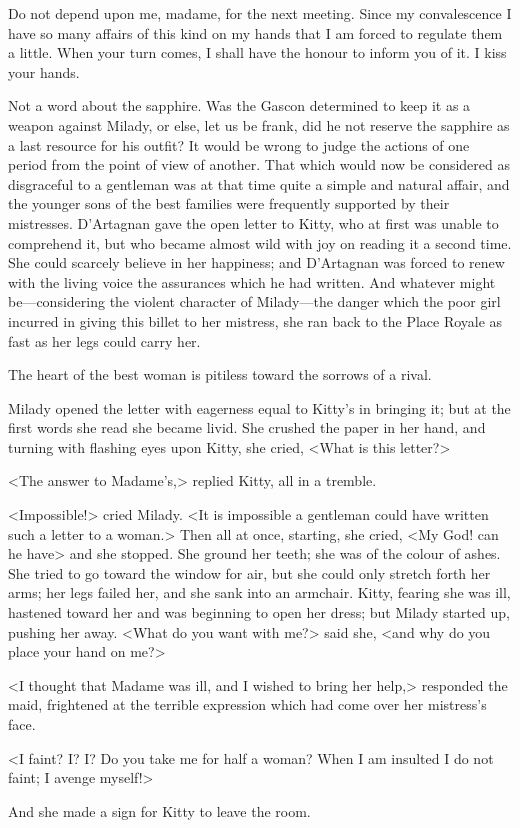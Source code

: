 \begin{mail}{}{}
Do not depend upon me, madame, for the next meeting. Since my convalescence I have so many affairs of this kind on my hands that I am forced to regulate them a little. When your turn comes, I shall have the honour to inform you of it. I kiss your hands. 
\end{mail}

Not a word about the sapphire. Was the Gascon determined to keep it as a weapon against Milady, or else, let us be frank, did he not reserve the sapphire as a last resource for his outfit? It would be wrong to judge the actions of one period from the point of view of another. That which would now be considered as disgraceful to a gentleman was at that time quite a simple and natural affair, and the younger sons of the best families were frequently supported by their mistresses. D'Artagnan gave the open letter to Kitty, who at first was unable to comprehend it, but who became almost wild with joy on reading it a second time. She could scarcely believe in her happiness; and D'Artagnan was forced to renew with the living voice the assurances which he had written. And whatever might be—considering the violent character of Milady—the danger which the poor girl incurred in giving this billet to her mistress, she ran back to the Place Royale as fast as her legs could carry her. 

The heart of the best woman is pitiless toward the sorrows of a rival. 

Milady opened the letter with eagerness equal to Kitty's in bringing it; but at the first words she read she became livid. She crushed the paper in her hand, and turning with flashing eyes upon Kitty, she cried, <What is this letter?> 

<The answer to Madame's,> replied Kitty, all in a tremble. 

<Impossible!> cried Milady. <It is impossible a gentleman could have written such a letter to a woman.> Then all at once, starting, she cried, <My God! can he have\longdash> and she stopped. She ground her teeth; she was of the colour of ashes. She tried to go toward the window for air, but she could only stretch forth her arms; her legs failed her, and she sank into an armchair. Kitty, fearing she was ill, hastened toward her and was beginning to open her dress; but Milady started up, pushing her away. <What do you want with me?> said she, <and why do you place your hand on me?> 

<I thought that Madame was ill, and I wished to bring her help,> responded the maid, frightened at the terrible expression which had come over her mistress's face. 

<I faint? I? I? Do you take me for half a woman? When I am insulted I do not faint; I avenge myself!> 

And she made a sign for Kitty to leave the room. 